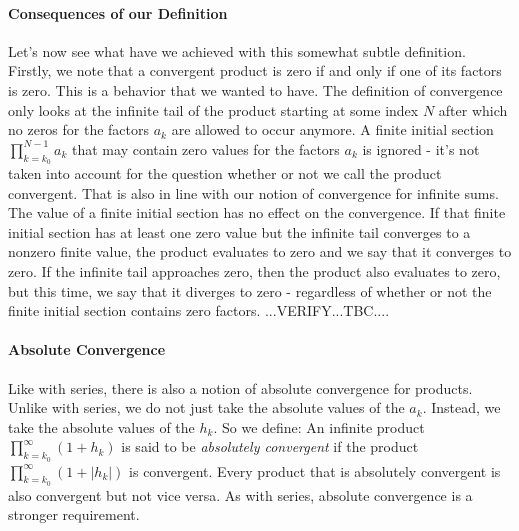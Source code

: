 \paragraph{Consequences of our Definition}
Let's now see what have we achieved with this somewhat subtle definition. Firstly, we note that a convergent product is zero if and only if one of its factors is zero. This is a behavior that we wanted to have. The definition of convergence only looks at the infinite tail of the product starting at some index $N$ after which no zeros for the factors $a_k$ are allowed to occur anymore. A finite initial section $\prod_{k=k_0}^{N-1} a_k$ that may contain zero values for the factors $a_k$ is ignored - it's not taken into account for the question whether or not we call the product convergent. That is also in line with our notion of convergence for infinite sums. The value of a finite initial section has no effect on the convergence. If that finite initial section has at least one zero value but the infinite tail converges to a nonzero finite value, the product evaluates to zero and we say that it converges to zero. If the infinite tail approaches zero, then the product also evaluates to zero, but this time, we say that it diverges to zero - regardless of whether or not the finite initial section contains zero factors. ...VERIFY...TBC....


\paragraph{Absolute Convergence}
Like with series, there is also a notion of absolute convergence for products. Unlike with series, we do not just take the absolute values of the $a_k$. Instead, we take the absolute values of the $h_k$. So we define: An infinite product $\prod_{k=k_0}^{\infty} (1 + h_k)$ is said to be \emph{absolutely convergent} if the product $\prod_{k=k_0}^{\infty} (1 + |h_k|)$ is convergent. Every product that is absolutely convergent is also convergent but not vice versa. As with series, absolute convergence is a stronger requirement.









